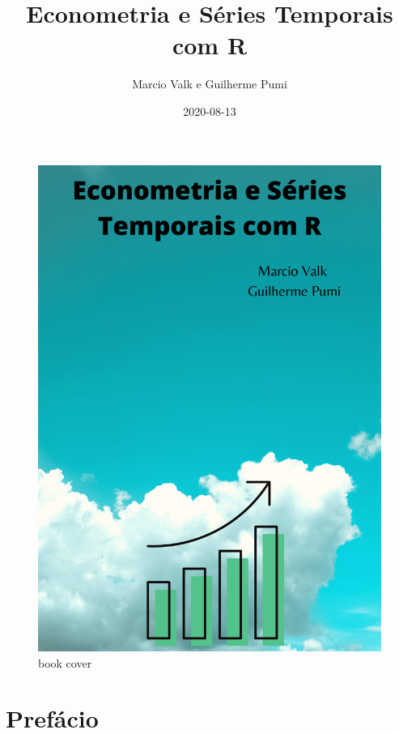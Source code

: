 \documentclass[
]{book}
\title{Econometria e Séries Temporais com R}
\author{Marcio Valk e Guilherme Pumi}
\date{2020-08-13}
\theoremstyle{definition}
\theoremstyle{definition}
\theoremstyle{definition}
\theoremstyle{remark}
\begin{document}
\maketitle

{
\setcounter{tocdepth}{1}
\tableofcontents
}
\hypertarget{section}{%
\chapter*{}\label{section}}

\begin{figure}
\centering
\includegraphics{cover1.png}
\caption{book cover}
\end{figure}

\hypertarget{prefuxe1cio}{%
\chapter*{Prefácio}\label{prefuxe1cio}}
\end{document}
